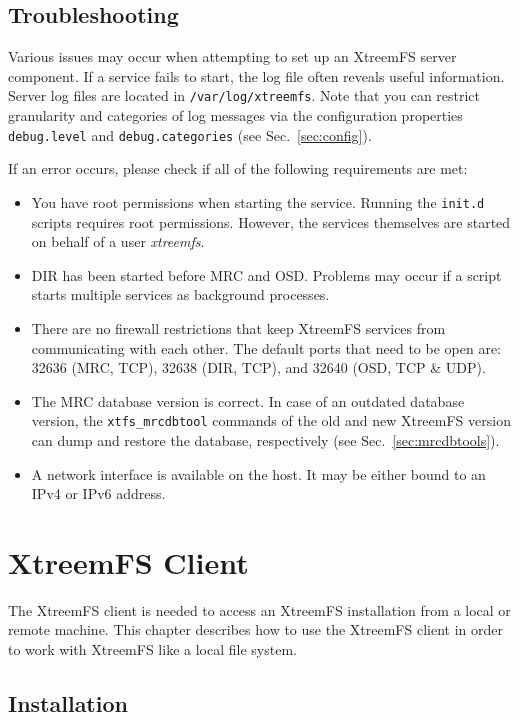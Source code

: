 \documentclass[a4paper,10pt]{book}
\begin{document}
\section{Troubleshooting}

Various issues may occur when attempting to set up an XtreemFS server component. If a service fails to start, the log file often reveals useful information. Server log files are located in \texttt{/var/log/xtreemfs}. Note that you can restrict granularity and categories of log messages via the configuration properties \texttt{debug.level} and \texttt{debug.categories} (see Sec.\ \ref{sec:config}).

If an error occurs, please check if all of the following requirements are met:
\begin{itemize}
 \item You have root permissions when starting the service. Running the \texttt{init.d} scripts requires root permissions. However, the services themselves are started on behalf of a user \textit{xtreemfs}.
 \item DIR has been started before MRC and OSD. Problems may occur if a script starts multiple services as background processes.
 \item There are no firewall restrictions that keep XtreemFS services from communicating with each other. The default ports that need to be open are: 32636 (MRC, TCP), 32638 (DIR, TCP), and 32640 (OSD, TCP \& UDP).
 \item The MRC database version is correct. In case of an outdated database version, the \texttt{xtfs\_mrcdbtool} commands of the old and new XtreemFS version can dump and restore the database, respectively (see Sec.\ \ref{sec:mrcdbtools}).
 \item A network interface is available on the host. It may be either bound to an IPv4 or IPv6 address.
\end{itemize}


\chapter{XtreemFS Client}

The XtreemFS client is needed to access an XtreemFS installation from a local or remote machine. This chapter describes how to use the XtreemFS client in order to work with XtreemFS like a local file system.

\section{Installation}
\label{sec:client_installation}
\end{document}
